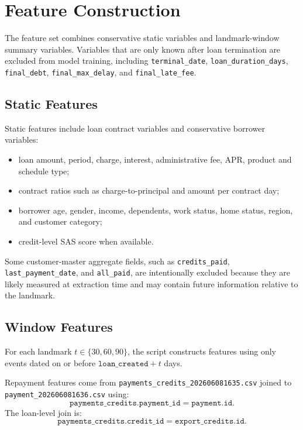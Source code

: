 \documentclass[11pt]{article}
\begin{document}
\section{Feature Construction}

The feature set combines conservative static variables and landmark-window summary variables. Variables that are only known after loan termination are excluded from model training, including \texttt{terminal\_date}, \texttt{loan\_duration\_days}, \texttt{final\_debt}, \texttt{final\_max\_delay}, and \texttt{final\_late\_fee}.

\subsection{Static Features}

Static features include loan contract variables and conservative borrower variables:

\begin{itemize}
    \item loan amount, period, charge, interest, administrative fee, APR, product and schedule type;
    \item contract ratios such as charge-to-principal and amount per contract day;
    \item borrower age, gender, income, dependents, work status, home status, region, and customer category;
    \item credit-level SAS score when available.
\end{itemize}

Some customer-master aggregate fields, such as \texttt{credits\_paid}, \texttt{last\_payment\_date}, and \texttt{all\_paid}, are intentionally excluded because they are likely measured at extraction time and may contain future information relative to the landmark.

\subsection{Window Features}

For each landmark \(t \in \{30,60,90\}\), the script constructs features using only events dated on or before \(\texttt{loan\_created} + t\) days.

Repayment features come from \texttt{payments\_credits\_202606081635.csv} joined to \texttt{payment\_202606081636.csv} using:
\[
\texttt{payments\_credits.payment\_id} = \texttt{payment.id}.
\]
The loan-level join is:
\[
\texttt{payments\_credits.credit\_id} = \texttt{export\_credits.id}.
\]
\end{document}
